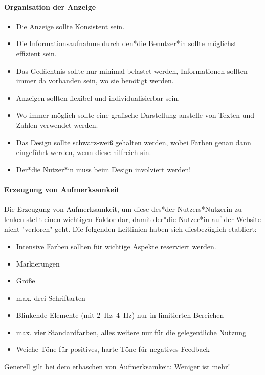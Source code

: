				\paragraph{Organisation der Anzeige}
					\begin{itemize}
						\item Die Anzeige sollte Konsistent sein.
						\item Die Informationsaufnahme durch den*die Benutzer*in sollte möglichst effizient sein.
						\item Das Gedächtnis sollte nur minimal belastet werden, \dh Informationen sollten immer da vorhanden sein, wo sie benötigt werden.
						\item Anzeigen sollten flexibel und individualisierbar sein.
						\item Wo immer möglich sollte eine grafische Darstellung anstelle von Texten und Zahlen verwendet werden.
						\item Das Design sollte schwarz-weiß gehalten werden, wobei Farben genau dann eingeführt werden, wenn diese hilfreich sin.
						\item Der*die Nutzer*in muss beim Design involviert werden!
					\end{itemize}

				\paragraph{Erzeugung von Aufmerksamkeit}
					Die Erzeugung von Aufmerksamkeit, um diese des*der Nutzers*Nutzerin zu lenken stellt einen wichtigen Faktor dar, damit der*die Nutzer*in auf der Website nicht "verloren" geht. Die folgenden Leitlinien haben sich diesbezüglich etabliert:
					\begin{itemize}
						\item Intensive Farben sollten für wichtige Aspekte reserviert werden.
						\item Markierungen
						\item Größe
						\item max. drei Schriftarten
						\item Blinkende Elemente (mit \SIrange{2}{4}{\hertz}) nur in limitierten Bereichen
						\item max. vier Standardfarben, alles weitere nur für die gelegentliche Nutzung
						\item Weiche Töne für positives, harte Töne für negatives Feedback
					\end{itemize}
					Generell gilt bei dem erhaschen von Aufmerksamkeit: Weniger ist mehr!

